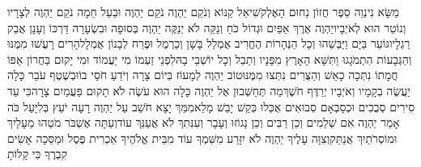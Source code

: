 \documentclass[../main/main.tex]{subfiles}
\begin{document}
\begin{multicols*}{\ncols}
מַשָּׂא נִינְוֵה סֵפֶר חֲזוֹן נַחוּם הָאֶלְקֹשִׁי\PreVerseSpace{}אֵל קַנּוֹא וְנֹקֵם יַהְוֶה נֹקֵם יַהְוֶה וּבַעַל חֵמָה נֹקֵם יַהְוֶה לְצָרָיו וְנוֹטֵר הוּא לְאֹיְבָיו\PreVerseSpace{}יַהְוֶה אֶרֶךְ אַפַּיִם וּגְדוֹל כֹּחַ וְנַקֵּה לֹא יְנַקֶּה יַהְוֶה בְּסוּפָה וּבִשְׂעָרָה דַּרְכּוֹ וְעָנָן אֲבַק רַגְלָיו\PreVerseSpace{}גּוֹעֵר בַּיָּם וַיַּבְּשֵׁהוּ וְכָל הַנְּהָרוֹת הֶחֱרִיב אֻמְלַל בָּשָׁן וְכַרְמֶל וּפֶרַח לְבָנוֹן אֻמְלָל\PreVerseSpace{}הָרִים רָעֲשׁוּ מִמֶּנּוּ וְהַגְּבָעוֹת הִתְמֹגָגוּ וַתִּשָּׁא\SubEnd{} הָאָרֶץ מִפָּנָיו וְתֵבֵל וְכָל יוֹשְׁבֵי בָהּ\PreVerseSpace{}לִפְנֵי זַעְמוֹ מִי יַעֲמוֹד וּמִי יָקוּם בַּחֲרוֹן אַפּוֹ חֲמָתוֹ נִתְּכָה כָאֵשׁ וְהַצֻּרִים נִתְּצוּ מִמֶּנּוּ\PreVerseSpace{}טוֹב יַהְוֶה לְמָעוֹז בְּיוֹם צָרָה וְיֹדֵעַ חֹסֵי בוֹ\PreVerseSpace{}וּבְשֶׁטֶף עֹבֵר כָּלָה יַעֲשֶׂה בְקָמָיו\SubEnd{} וְאֹיְבָיו יְרַדֶּף חֹשֶׁךְ\PreVerseSpace{}מַה תְּחַשְּׁבוּן אֶל יַהְוֶה כָּלָה הוּא עֹשֶׂה לֹא תָקוּם פַּעֲמַיִם צָרָה\PreVerseSpace{}כִּי עַד סִירִים סְבֻכִים וּכְסָבְאָם סְבוּאִים אֻכְּלוּ כְּקַשׁ יָבֵשׁ מָלֵא\PreVerseSpace{}מִמֵּךְ יָצָא חֹשֵׁב עַל יַהְוֶה רָעָה יֹעֵץ בְּלִיָּעַל \ClosedSection{}כֹּה אָמַר יַהְוֶה אִם שְׁלֵמִים וְכֵן רַבִּים וְכֵן נָגוֹזּוּ וְעָבָר וְעִנִּתִךְ לֹא אֲעַנֵּךְ עוֹד\PreVerseSpace{}וְעַתָּה אֶשְׁבֹּר מֹטֵהוּ מֵעָלָיִךְ וּמוֹסְרֹתַיִךְ אֲנַתֵּק\PreVerseSpace{}וְצִוָּה עָלֶיךָ יַהְוֶה לֹא יִזָּרַע מִשִּׁמְךָ עוֹד מִבֵּית אֱלֹהֶיךָ אַכְרִית פֶּסֶל וּמַסֵּכָה אָשִׂים קִבְרֶךָ כִּי קַלּוֹתָ\OpenSection{}\par

\end{multicols*}
\end{document}
